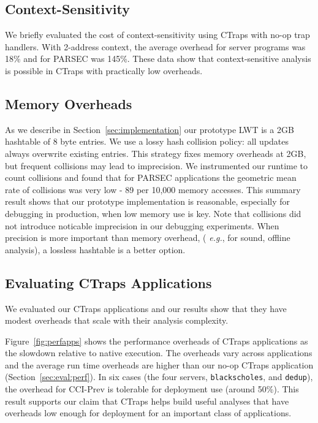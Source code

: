 \documentclass[pageno,nohyperref]{jpaper}
\newcommand{\ctraps}{CTraps\xspace}
\newcommand{\lwt}{LWT\xspace}
\begin{document}
\subsection{Context-Sensitivity}
We briefly evaluated the cost of context-sensitivity using \ctraps with no-op
trap handlers.  With 2-address context, the average overhead for server
programs was 18\% and for PARSEC was 145\%.  These data show that
context-sensitive analysis is possible in \ctraps with practically low overheads.

\subsection{Memory Overheads}
\label{sec:eval:performance:collisions}
As we describe in Section~\ref{sec:implementation} our prototype \lwt is a 2GB
hashtable of 8 byte entries.  We use a lossy hash collision policy: all updates
always overwrite existing entries.  This strategy fixes memory overheads at
2GB, but frequent collisions may lead to imprecision.   We instrumented our
runtime to count collisions and found that for PARSEC applications the
geometric mean rate of collisions was very low - 89 per 10,000 memory accesses.
This summary result shows that our prototype implementation is reasonable,
especially for debugging in production, when low memory use is key.  Note that
collisions did not introduce noticable imprecision in our debugging
experiments.  When precision is more important than memory overhead, ({\em
e.g.}, for sound, offline analysis), a lossless hashtable is a better option.  

\subsection{Evaluating CTraps Applications}
\label{sec:appperf}
We evaluated our CTraps applications and our results show that 
they have modest overheads that scale with their analysis complexity. 

Figure~\ref{fig:perfapps} shows the performance overheads of 
\ctraps applications as the slowdown relative to native execution.  The overheads
vary across applications and the average run time overheads are
higher than our no-op \ctraps application (Section~\ref{sec:eval:perf}).  In
six cases (the four servers, {\tt blackscholes}, and {\tt dedup}), the overhead
for CCI-Prev is tolerable for deployment use (around 50\%).  This result
supports our claim that \ctraps helps build useful analyses that have overheads
low enough for deployment for an important class of applications.  
\end{document}
